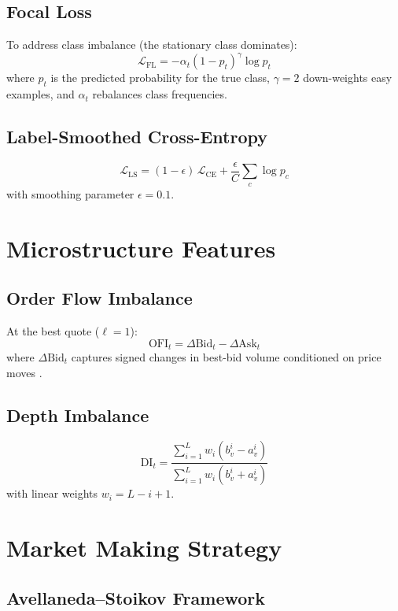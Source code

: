 \documentclass[11pt,a4paper]{article}
\begin{document}
\subsection{Focal Loss}

To address class imbalance (the stationary class dominates):
\[
  \mathcal{L}_{\text{FL}} = -\alpha_t (1 - p_t)^\gamma \log p_t
\]
where $p_t$ is the predicted probability for the true class, $\gamma=2$
down-weights easy examples, and $\alpha_t$ rebalances class frequencies.

\subsection{Label-Smoothed Cross-Entropy}
\[
  \mathcal{L}_{\text{LS}} = (1-\epsilon)\,\mathcal{L}_{\text{CE}} +
  \frac{\epsilon}{C} \sum_{c} \log p_c
\]
with smoothing parameter $\epsilon = 0.1$.

\section{Microstructure Features}
\label{sec:features}

\subsection{Order Flow Imbalance}
At the best quote ($\ell=1$):
\[
  \text{OFI}_t = \Delta\text{Bid}_t - \Delta\text{Ask}_t
\]
where $\Delta\text{Bid}_t$ captures signed changes in best-bid volume
conditioned on price moves \citep{cont2014price}.

\subsection{Depth Imbalance}
\[
  \text{DI}_t = \frac{\sum_{i=1}^L w_i (b_v^i - a_v^i)}
                     {\sum_{i=1}^L w_i (b_v^i + a_v^i)}
\]
with linear weights $w_i = L - i + 1$.

\section{Market Making Strategy}
\label{sec:strategy}

\subsection{Avellaneda--Stoikov Framework}
\end{document}

